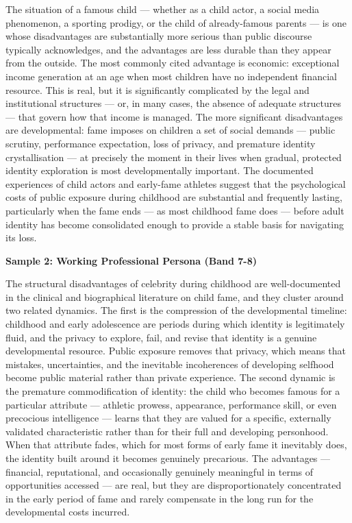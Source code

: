 The situation of a famous child — whether as a child actor, a social media phenomenon, a sporting prodigy, or the child of already-famous parents — is one whose disadvantages are substantially more serious than public discourse typically acknowledges, and the advantages are less durable than they appear from the outside. The most commonly cited advantage is economic: exceptional income generation at an age when most children have no independent financial resource. This is real, but it is significantly complicated by the legal and institutional structures — or, in many cases, the absence of adequate structures — that govern how that income is managed. The more significant disadvantages are developmental: fame imposes on children a set of social demands — public scrutiny, performance expectation, loss of privacy, and premature identity crystallisation — at precisely the moment in their lives when gradual, protected identity exploration is most developmentally important. The documented experiences of child actors and early-fame athletes suggest that the psychological costs of public exposure during childhood are substantial and frequently lasting, particularly when the fame ends — as most childhood fame does — before adult identity has become consolidated enough to provide a stable basis for navigating its loss.

\textbf{Sample 2: Working Professional Persona (Band 7-8)}

The structural disadvantages of celebrity during childhood are well-documented in the clinical and biographical literature on child fame, and they cluster around two related dynamics. The first is the compression of the developmental timeline: childhood and early adolescence are periods during which identity is legitimately fluid, and the privacy to explore, fail, and revise that identity is a genuine developmental resource. Public exposure removes that privacy, which means that mistakes, uncertainties, and the inevitable incoherences of developing selfhood become public material rather than private experience. The second dynamic is the premature commodification of identity: the child who becomes famous for a particular attribute — athletic prowess, appearance, performance skill, or even precocious intelligence — learns that they are valued for a specific, externally validated characteristic rather than for their full and developing personhood. When that attribute fades, which for most forms of early fame it inevitably does, the identity built around it becomes genuinely precarious. The advantages — financial, reputational, and occasionally genuinely meaningful in terms of opportunities accessed — are real, but they are disproportionately concentrated in the early period of fame and rarely compensate in the long run for the developmental costs incurred.

